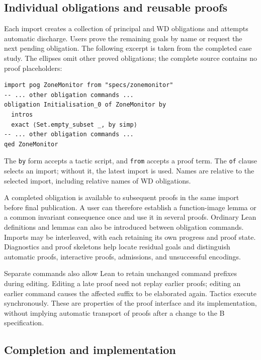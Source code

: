 \subsection{Individual obligations and reusable proofs}

Each import creates a collection of principal and WD obligations and
attempts automatic discharge. Users prove the remaining goals by name
or request the next pending obligation. The following excerpt is taken
from the completed case study. The ellipses omit other proved obligations;
the complete source contains no proof placeholders:
\par\noindent\begin{minipage}{\linewidth}
\begin{lstlisting}
import pog ZoneMonitor from "specs/zonemonitor"
-- ... other obligation commands ...
obligation Initialisation_0 of ZoneMonitor by
  intros
  exact ⟨Set.empty_subset _, by simp⟩
-- ... other obligation commands ...
qed ZoneMonitor
\end{lstlisting}
\end{minipage}\par
The \texttt{by} form accepts a tactic script, and \texttt{from} accepts a
proof term. The \texttt{of} clause selects an import; without it, the
latest import is used. Names are relative to the selected import,
including relative names of WD obligations.

A completed obligation is available to subsequent proofs in the same
import before final publication. A user can therefore establish a
function-image lemma or a common invariant consequence once and use it
in several proofs. Ordinary Lean definitions and lemmas can also be
introduced between obligation commands. Imports may be interleaved,
with each retaining its own progress and proof state. Diagnostics and
proof skeletons help locate residual goals and distinguish automatic
proofs, interactive proofs, admissions, and unsuccessful encodings.

Separate commands also allow Lean to retain unchanged command prefixes
during editing. Editing a late proof need not replay earlier proofs;
editing an earlier command causes the affected suffix to be elaborated
again. Tactics execute synchronously. These are properties of the proof
interface and its implementation, without implying automatic transport
of proofs after a change to the B specification.

\subsection{Completion and implementation}


